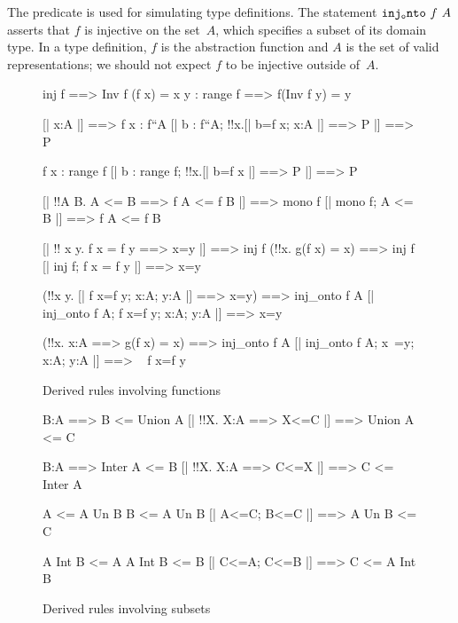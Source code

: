 The predicate  is used for simulating type definitions.
The statement ${\tt inj_onto}~f~A$ asserts that $f$ is injective on the
set~$A$, which specifies a subset of its domain type.  In a type
definition, $f$ is the abstraction function and $A$ is the set of valid
representations; we should not expect $f$ to be injective outside of~$A$.

\begin{figure} \underscoreon
\begin{ttbox}
    inj f ==> Inv f (f x) = x
    y : range f ==> f(Inv f y) = y

%
     [| x:A |] ==> f x : f``A
     [| b : f``A;  !!x.[| b=f x;  x:A |] ==> P |] ==> P

     f x : range f
     [| b : range f;  !!x.[| b=f x |] ==> P |] ==> P

      [| !!A B. A <= B ==> f A <= f B |] ==> mono f
      [| mono f;  A <= B |] ==> f A <= f B

       [| !! x y. f x = f y ==> x=y |] ==> inj f
              (!!x. g(f x) = x) ==> inj f
       [| inj f; f x = f y |] ==> x=y

  (!!x y. [| f x=f y; x:A; y:A |] ==> x=y) ==> inj_onto f A
  [| inj_onto f A;  f x=f y;  x:A;  y:A |] ==> x=y

    (!!x. x:A ==> g(f x) = x) ==> inj_onto f A
    [| inj_onto f A;  x~=y;  x:A;  y:A |] ==> ~ f x=f y
\end{ttbox}
\caption{Derived rules involving functions} \label{chol-fun}
\end{figure}


\begin{figure} \underscoreon
\begin{ttbox}
     B:A ==> B <= Union A
     [| !!X. X:A ==> X<=C |] ==> Union A <= C

     B:A ==> Inter A <= B
  [| !!X. X:A ==> C<=X |] ==> C <= Inter A

       A <= A Un B
       B <= A Un B
        [| A<=C;  B<=C |] ==> A Un B <= C

      A Int B <= A
      A Int B <= B
    [| C<=A;  C<=B |] ==> C <= A Int B
\end{ttbox}
\caption{Derived rules involving subsets} \label{chol-subset}
\end{figure}


